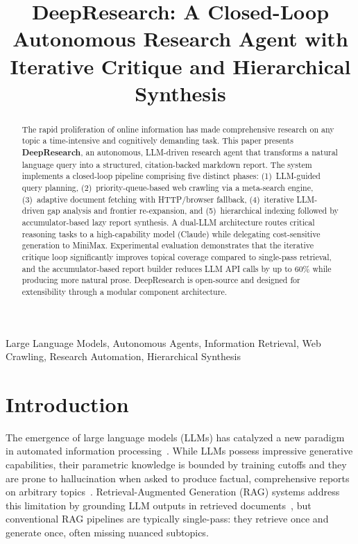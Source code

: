 \documentclass[conference]{IEEEtran}
\begin{document}
\title{DeepResearch: A Closed-Loop Autonomous Research Agent with Iterative Critique and Hierarchical Synthesis}

\author{
}

\maketitle

\begin{abstract}
The rapid proliferation of online information has made comprehensive research on any topic a time-intensive and cognitively demanding task. This paper presents \textbf{DeepResearch}, an autonomous, LLM-driven research agent that transforms a natural language query into a structured, citation-backed markdown report. The system implements a closed-loop pipeline comprising five distinct phases: (1)~LLM-guided query planning, (2)~priority-queue-based web crawling via a meta-search engine, (3)~adaptive document fetching with HTTP/browser fallback, (4)~iterative LLM-driven gap analysis and frontier re-expansion, and (5)~hierarchical indexing followed by accumulator-based lazy report synthesis. A dual-LLM architecture routes critical reasoning tasks to a high-capability model (Claude) while delegating cost-sensitive generation to MiniMax. Experimental evaluation demonstrates that the iterative critique loop significantly improves topical coverage compared to single-pass retrieval, and the accumulator-based report builder reduces LLM API calls by up to 60\% while producing more natural prose. DeepResearch is open-source and designed for extensibility through a modular component architecture.
\end{abstract}

\begin{IEEEkeywords}
Large Language Models, Autonomous Agents, Information Retrieval, Web Crawling, Research Automation, Hierarchical Synthesis
\end{IEEEkeywords}

\section{Introduction}

The emergence of large language models (LLMs) has catalyzed a new paradigm in automated information processing~\cite{openai2023gpt4}. While LLMs possess impressive generative capabilities, their parametric knowledge is bounded by training cutoffs and they are prone to hallucination when asked to produce factual, comprehensive reports on arbitrary topics~\cite{ji2023hallucination}. Retrieval-Augmented Generation (RAG) systems address this limitation by grounding LLM outputs in retrieved documents~\cite{lewis2020rag}, but conventional RAG pipelines are typically single-pass: they retrieve once and generate once, often missing nuanced subtopics.
\end{document}

